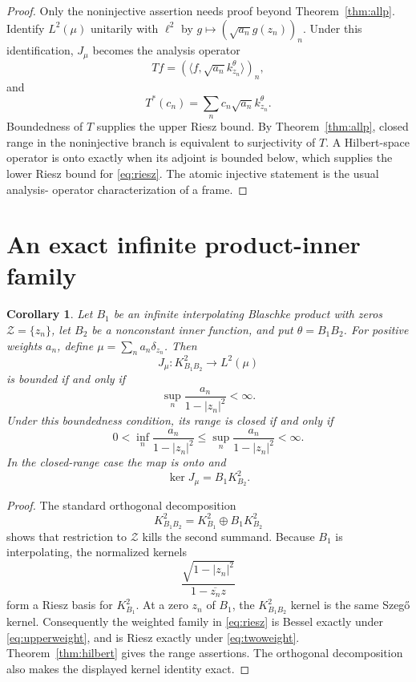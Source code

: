 \documentclass[10pt]{article}
\newtheorem{corollary}{Corollary}
\begin{document}
\begin{proof}
Only the noninjective assertion needs proof beyond
Theorem~\ref{thm:allp}.  Identify $L^2(\mu)$ unitarily with $\ell^2$ by
$g\mapsto(\sqrt{a_n}g(z_n))_n$.  Under this identification, $J_\mu$ becomes
the analysis operator
\[
 Tf=(\langle f,\sqrt{a_n}k_{z_n}^\theta\rangle)_n,
\]
and
\[
 T^*(c_n)=\sum_n c_n\sqrt{a_n}k_{z_n}^\theta.
\]
Boundedness of $T$ supplies the upper Riesz bound.  By
Theorem~\ref{thm:allp}, closed range in the noninjective branch is equivalent
to surjectivity of $T$.  A Hilbert-space operator is onto exactly when its
adjoint is bounded below, which supplies the lower Riesz bound for
\eqref{eq:riesz}.  The atomic injective statement is the usual analysis-
operator characterization of a frame.
\end{proof}

\section{An exact infinite product-inner family}

\begin{corollary}\label{cor:product}
Let $B_1$ be an infinite interpolating Blaschke product with zeros
$\mathcal Z=\{z_n\}$, let $B_2$ be a nonconstant inner function, and put
$\theta=B_1B_2$.  For positive weights $a_n$, define
$\mu=\sum_n a_n\delta_{z_n}$.  Then
\[
 J_\mu:K_{B_1B_2}^2\longrightarrow L^2(\mu)
\]
is bounded if and only if
\begin{equation}\label{eq:upperweight}
 \sup_n\frac{a_n}{1-|z_n|^2}<\infty.
\end{equation}
Under this boundedness condition, its range is closed if and only if
\begin{equation}\label{eq:twoweight}
 0<\inf_n\frac{a_n}{1-|z_n|^2}
 \le \sup_n\frac{a_n}{1-|z_n|^2}<\infty.
\end{equation}
In the closed-range case the map is onto and
\[
 \ker J_\mu=B_1K_{B_2}^2.
\]
\end{corollary}

\begin{proof}
The standard orthogonal decomposition
\[
 K_{B_1B_2}^2=K_{B_1}^2\oplus B_1K_{B_2}^2
\]
shows that restriction to $\mathcal Z$ kills the second summand.  Because
$B_1$ is interpolating, the normalized kernels
\[
 \frac{\sqrt{1-|z_n|^2}}{1-\overline{z_n}z}
\]
form a Riesz basis for $K_{B_1}^2$.  At a zero $z_n$ of $B_1$, the
$K_{B_1B_2}^2$ kernel is the same Szeg\H{o} kernel.  Consequently the weighted
family in \eqref{eq:riesz} is Bessel exactly under
\eqref{eq:upperweight}, and is Riesz exactly under
\eqref{eq:twoweight}.  Theorem~\ref{thm:hilbert} gives the range assertions.
The orthogonal decomposition also makes the displayed kernel identity exact.
\end{proof}
\end{document}
